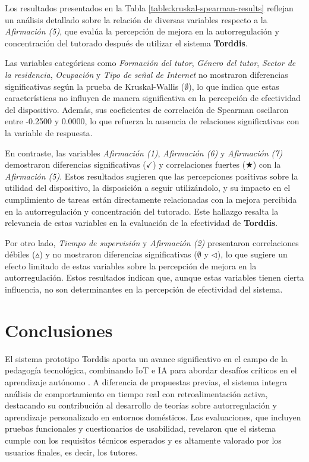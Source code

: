 \documentclass[a4paper,fleqn]{cas-sc}
\begin{document}
				Los resultados presentados en la Tabla \ref{table:kruskal-spearman-results} reflejan un análisis detallado sobre la relación de diversas variables respecto a la \textit{Afirmación (5)}, que evalúa la percepción de mejora en la autorregulación y concentración del tutorado después de utilizar el sistema \textbf{Torddis}.
				
				Las variables categóricas como \textit{Formación del tutor}, \textit{Género del tutor}, \textit{Sector de la residencia}, \textit{Ocupación} y \textit{Tipo de señal de Internet} no mostraron diferencias significativas según la prueba de Kruskal-Wallis (\(\emptyset\)), lo que indica que estas características no influyen de manera significativa en la percepción de efectividad del dispositivo. Además, sus coeficientes de correlación de Spearman oscilaron entre -0.2500 y 0.0000, lo que refuerza la ausencia de relaciones significativas con la variable de respuesta.
				
				En contraste, las variables \textit{Afirmación (1)}, \textit{Afirmación (6)} y \textit{Afirmación (7)} demostraron diferencias significativas (\(\checkmark\)) y correlaciones fuertes (\(\bigstar\)) con la \textit{Afirmación (5)}. Estos resultados sugieren que las percepciones positivas sobre la utilidad del dispositivo, la disposición a seguir utilizándolo, y su impacto en el cumplimiento de tareas están directamente relacionadas con la mejora percibida en la autorregulación y concentración del tutorado. Este hallazgo resalta la relevancia de estas variables en la evaluación de la efectividad de \textbf{Torddis}.
				
				Por otro lado, \textit{Tiempo de supervisión} y \textit{Afirmación (2)} presentaron correlaciones débiles (\(\vartriangle\)) y no mostraron diferencias significativas (\(\emptyset\) y \(\triangleleft\)), lo que sugiere un efecto limitado de estas variables sobre la percepción de mejora en la autorregulación. Estos resultados indican que, aunque estas variables tienen cierta influencia, no son determinantes en la percepción de efectividad del sistema.
		 
	\section{Conclusiones}
	\label{seccion:Seis}
		El sistema prototipo Torddis aporta un avance significativo en el campo de la pedagogía tecnológica, combinando IoT e IA para abordar desafíos críticos en el aprendizaje autónomo \citep{DiPietro2025Meta}. A diferencia de propuestas previas, el sistema integra análisis de comportamiento en tiempo real con retroalimentación activa, destacando su contribución al desarrollo de teorías sobre autorregulación y aprendizaje personalizado en entornos domésticos. Las evaluaciones, que incluyen pruebas funcionales y cuestionarios de usabilidad, revelaron que el sistema cumple con los requisitos técnicos esperados y es altamente valorado por los usuarios finales, es decir, los tutores.
		
\end{document}
